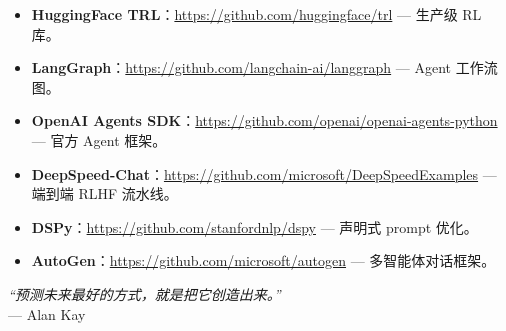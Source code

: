 \begin{itemize}
  \item \textbf{HuggingFace TRL}：\href{https://github.com/huggingface/trl}{https://github.com/huggingface/trl} --- 生产级 RL 库。
  \item \textbf{LangGraph}：\href{https://github.com/langchain-ai/langgraph}{https://github.com/langchain-ai/langgraph} --- Agent 工作流图。
  \item \textbf{OpenAI Agents SDK}：\href{https://github.com/openai/openai-agents-python}{https://github.com/openai/openai-agents-python} --- 官方 Agent 框架。
  \item \textbf{DeepSpeed-Chat}：\href{https://github.com/microsoft/DeepSpeedExamples}{https://github.com/microsoft/DeepSpeedExamples} --- 端到端 RLHF 流水线。
  \item \textbf{DSPy}：\href{https://github.com/stanfordnlp/dspy}{https://github.com/stanfordnlp/dspy} --- 声明式 prompt 优化。
  \item \textbf{AutoGen}：\href{https://github.com/microsoft/autogen}{https://github.com/microsoft/autogen} --- 多智能体对话框架。
\end{itemize}

\emph{“预测未来最好的方式，就是把它创造出来。”}\\

--- Alan Kay
